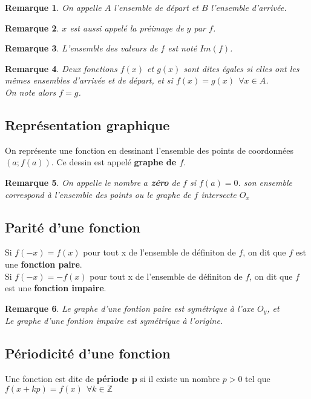 \documentclass[12pt, a4paper]{book}
\newtheorem*{remarque}{Remarque}
\begin{document}
\begin{remarque}
    On appelle $A$ l'ensemble de départ et $B$ l'ensemble d'arrivée.
\end{remarque}
\begin{remarque}
    $x$ est aussi appelé la préimage de $y$ par $f$.
\end{remarque}
\begin{remarque}
L'ensemble des valeurs de $f$ est noté $Im(f)$.
\end{remarque}
\begin{remarque}
    Deux fonctions $f(x)$ et $g(x)$ sont dites égales si elles ont les mêmes ensembles d'arrivée et de départ, et si $f(x) = g(x)\ \ \forall x \in A$.\\
    On note alors $f = g$.\\
\end{remarque}
\subsection{Représentation graphique}

    On représente une fonction en dessinant l'ensemble des points de coordonnées $(a;f(a))$. Ce dessin est appelé \textbf{graphe de $f$}.

\begin{remarque}
    On appelle le nombre $a$ \textbf{zéro} de $f$ si $f(a)=0$. son ensemble correspond à l'ensemble des points ou le graphe de $f$ intersecte $O_x$
\end{remarque}
\newpage
\subsection{Parité d'une fonction}

    Si $f(-x) = f(x)$ pour tout x de l'ensemble de définiton de $f$, on dit que $f$ est une \textbf{fonction paire}. \\
    Si $f(-x) = -f(x)$ pour tout x de l'ensemble de définiton de $f$, on dit que $f$ est une \textbf{fonction impaire}. 

\begin{remarque}
    Le graphe d'une fontion paire est symétrique à l'axe $O_y$, et \\
    Le graphe d'une fontion impaire est symétrique à l'origine.\\
\end{remarque}

\subsection{Périodicité d'une fonction}
    Une fonction est dite de \textbf{période p} si il existe un nombre $p > 0$ tel que $f(x+kp) = f(x) \ \ \forall k \in \mathbb{Z}$\\
\end{document}

